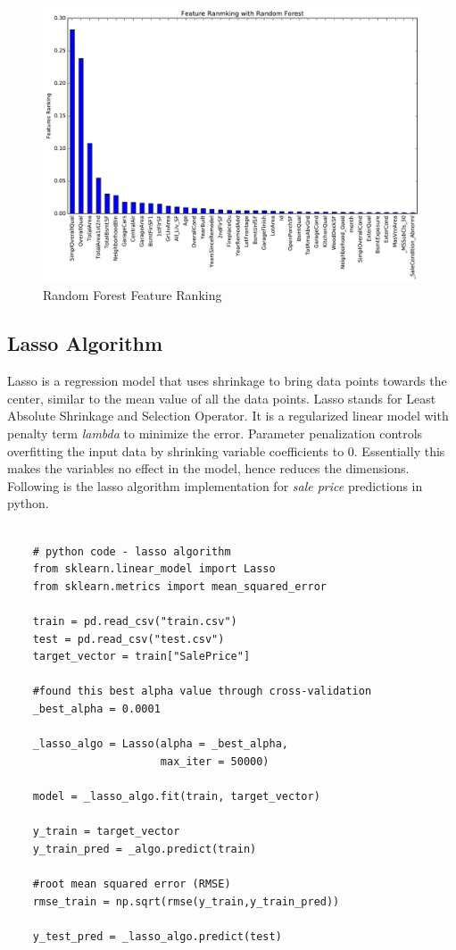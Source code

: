 \documentclass[sigconf]{acmart}
\begin{document}
	
	\begin{figure}[H]
		\centering
		\includegraphics[width=0.85\columnwidth]{images/random_forest_feature_ranking}	
		\caption{Random Forest Feature Ranking} \label{fig:random_feature_ranking} 
	\end{figure}
	
	\subsection{Lasso Algorithm}
	Lasso is a regression model that uses shrinkage to bring data points towards the center, similar to the mean value of all the data points. Lasso stands for Least Absolute Shrinkage and Selection Operator. It is a regularized linear model with penalty term {\em lambda} to minimize the error. Parameter penalization controls overfitting the input data by shrinking variable coefficients to 0. Essentially this makes the variables no effect in the model, hence reduces the dimensions. Following is the lasso algorithm implementation for {\em sale price} predictions in python.
		
	\begin{verbatim}
	
	# python code - lasso algorithm
	from sklearn.linear_model import Lasso
	from sklearn.metrics import mean_squared_error
	
	train = pd.read_csv("train.csv")
	test = pd.read_csv("test.csv")
	target_vector = train["SalePrice"]
	
	#found this best alpha value through cross-validation
	_best_alpha = 0.0001	
	
	_lasso_algo = Lasso(alpha = _best_alpha, 
	                    max_iter = 50000)
	
	model = _lasso_algo.fit(train, target_vector)  
		
	y_train = target_vector
	y_train_pred = _algo.predict(train)
	
	#root mean squared error (RMSE)
	rmse_train = np.sqrt(rmse(y_train,y_train_pred))
		
	y_test_pred = _lasso_algo.predict(test)	
	
	\end{verbatim}
	
\end{document}
